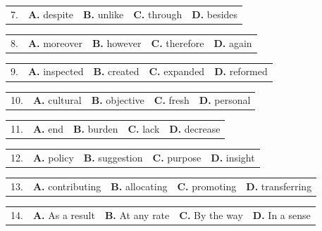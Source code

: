 \documentclass[UTF8,11pt]{ctexart}
\begin{document}
\noindent\begin{tabularx}{\linewidth}{@{}lXXXX@{}}7. & \textbf{A.} despite & \textbf{B.} unlike & \textbf{C.} through & \textbf{D.} besides\\\end{tabularx}\par

\noindent\begin{tabularx}{\linewidth}{@{}lXXXX@{}}8. & \textbf{A.} moreover & \textbf{B.} however & \textbf{C.} therefore & \textbf{D.} again\\\end{tabularx}\par

\noindent\begin{tabularx}{\linewidth}{@{}lXXXX@{}}9. & \textbf{A.} inspected & \textbf{B.} created & \textbf{C.} expanded & \textbf{D.} reformed\\\end{tabularx}\par

\noindent\begin{tabularx}{\linewidth}{@{}lXXXX@{}}10. & \textbf{A.} cultural & \textbf{B.} objective & \textbf{C.} fresh & \textbf{D.} personal\\\end{tabularx}\par

\noindent\begin{tabularx}{\linewidth}{@{}lXXXX@{}}11. & \textbf{A.} end & \textbf{B.} burden & \textbf{C.} lack & \textbf{D.} decrease\\\end{tabularx}\par

\noindent\begin{tabularx}{\linewidth}{@{}lXXXX@{}}12. & \textbf{A.} policy & \textbf{B.} suggestion & \textbf{C.} purpose & \textbf{D.} insight\\\end{tabularx}\par

\noindent\begin{tabularx}{\linewidth}{@{}lXXXX@{}}13. & \textbf{A.} contributing & \textbf{B.} allocating & \textbf{C.} promoting & \textbf{D.} transferring\\\end{tabularx}\par

\noindent\begin{tabularx}{\linewidth}{@{}lXXXX@{}}14. & \textbf{A.} As a result & \textbf{B.} At any rate & \textbf{C.} By the way & \textbf{D.} In a sense\\\end{tabularx}\par
\end{document}
